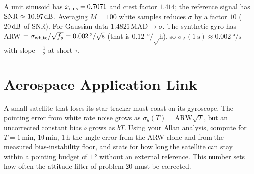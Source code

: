\documentclass[11pt,a4paper]{article}
\begin{document}
\begin{checkpoint}
A unit sinusoid has $x_{\rm rms}=0.7071$ and crest factor $1.414$; the reference signal has $\mathrm{SNR}\approx\dB{10.97}$. Averaging $M=100$ white samples reduces $\sigma$ by a factor $10$ ($\dB{20}$ of SNR). For Gaussian data $1.4826\,\mathrm{MAD}\to\sigma$. The synthetic gyro has ARW $=\sigma_{\rm white}/\sqrt{f_s}=\SI{0.002}{\degree\per\sqrt\second}$ (that is $\SI{0.12}{\degree\per\sqrt\hour}$), so $\sigma_A(\SI{1}{\second})\approx\SI{0.002}{\degree\per\second}$ with slope $-\tfrac12$ at short $\tau$.
\end{checkpoint}

\section*{Aerospace Application Link}
A small satellite that loses its star tracker must coast on its gyroscope. The pointing error from white rate noise grows as $\sigma_\theta(T)=\mathrm{ARW}\sqrt T$, but an uncorrected constant bias $b$ grows as $bT$. Using your Allan analysis, compute for $T=1\,\mathrm{min},\,10\,\mathrm{min},\,1\,\mathrm{h}$ the angle error from the ARW alone and from the measured bias-instability floor, and state for how long the satellite can stay within a pointing budget of $\SI{1}{\degree}$ without an external reference. This number sets how often the attitude filter of problem 20 must be corrected.
\end{document}
